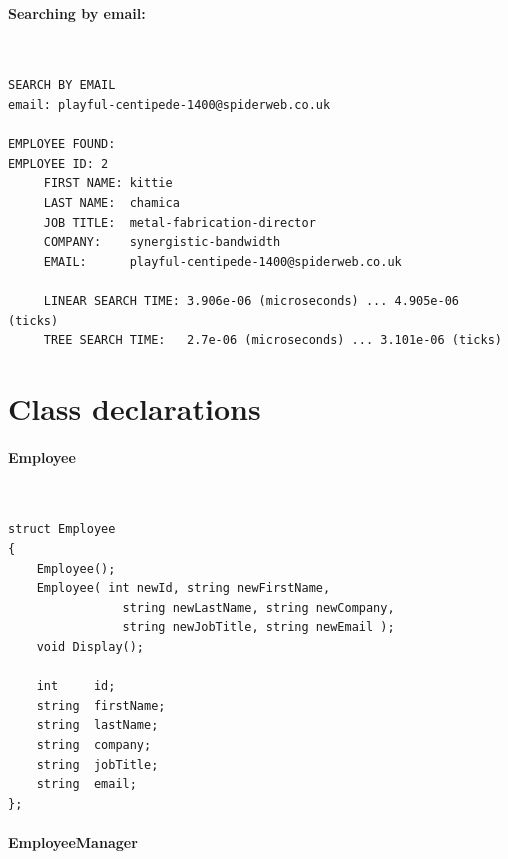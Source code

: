 \documentclass[a4paper,12pt,oneside]{book}
\begin{document}
    \paragraph{Searching by email:} ~\\

    \begin{lstlisting}[style=output]
SEARCH BY EMAIL
email: playful-centipede-1400@spiderweb.co.uk

EMPLOYEE FOUND:
EMPLOYEE ID: 2
	 FIRST NAME: kittie
	 LAST NAME:  chamica
	 JOB TITLE:  metal-fabrication-director
	 COMPANY:    synergistic-bandwidth
	 EMAIL:      playful-centipede-1400@spiderweb.co.uk

	 LINEAR SEARCH TIME: 3.906e-06 (microseconds) ... 4.905e-06 (ticks)
	 TREE SEARCH TIME:   2.7e-06 (microseconds) ... 3.101e-06 (ticks)
    \end{lstlisting}


    \newpage

    \section{Class declarations}

    \paragraph{Employee} ~\\

    \begin{lstlisting}[style=code]
struct Employee
{
    Employee();
    Employee( int newId, string newFirstName,
                string newLastName, string newCompany,
                string newJobTitle, string newEmail );
    void Display();

    int     id;
    string  firstName;
    string  lastName;
    string  company;
    string  jobTitle;
    string  email;
};
    \end{lstlisting}

    \paragraph{EmployeeManager} ~\\
\end{document}
